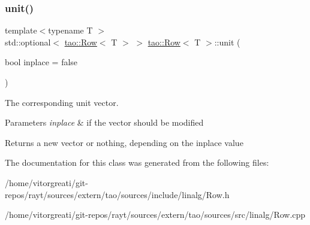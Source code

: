 \subsubsection{\texorpdfstring{unit()}{unit()}}
{\footnotesize\ttfamily template$<$typename T $>$ \\
std\+::optional$<$ \mbox{\hyperlink{classtao_1_1_row}{tao\+::\+Row}}$<$ T $>$ $>$ \mbox{\hyperlink{classtao_1_1_row}{tao\+::\+Row}}$<$ T $>$\+::unit (\begin{DoxyParamCaption}\item[{bool}]{inplace = {\ttfamily false} }\end{DoxyParamCaption})}



The corresponding unit vector. 


\begin{DoxyParams}{Parameters}
{\em inplace} & if the vector should be modified \\
\hline
\end{DoxyParams}
\begin{DoxyReturn}{Returns}
a new vector or nothing, depending on the inplace value 
\end{DoxyReturn}


The documentation for this class was generated from the following files\+:\begin{DoxyCompactItemize}
\item 
/home/vitorgreati/git-\/repos/rayt/sources/extern/tao/sources/include/linalg/Row.\+h\item 
/home/vitorgreati/git-\/repos/rayt/sources/extern/tao/sources/src/linalg/Row.\+cpp\end{DoxyCompactItemize}
